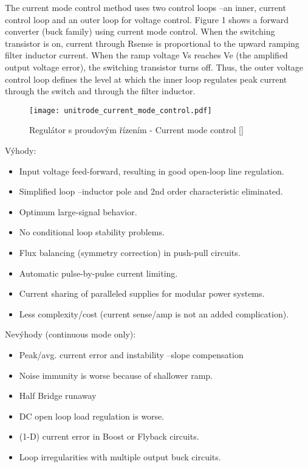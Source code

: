          The current mode control method uses two control loops --an inner, current control loop
         and an outer loop for voltage control. Figure  1 shows a forward converter (buck family)
         using current mode control. When the switching transistor is on, current through Rsense is
         proportional to the upward ramping filter inductor current. When the ramp voltage Vs
         reaches Ve (the amplified  output  voltage  error), the switching transistor turns  off.
         Thus, the outer voltage control loop defines the level at which the inner loop regulates
         peak current through the switch and through the filter inductor. \cite{SLUP075}

        \begin{figure*}
          \centering
          \texttt{[image: unitrode\_current\_mode\_control.pdf]}
          \caption[Regulátor s proudovým řízením]{Regulátor s proudovým řízením - Current mode
                   control [\cite{SLUA119}]}
          \label{ENZ:fig_I_mode_cntrl}
        \end{figure*}

        Výhody:
        \begin{itemize}
          \item Input voltage feed-forward, resulting in good open-loop line regulation.
          \item Simplified loop --inductor pole and 2nd order characteristic eliminated.
          \item Optimum large-signal behavior.
          \item No conditional loop stability  problems.
          \item Flux balancing (symmetry correction) in push-pull circuits.
          \item Automatic pulse-by-pulse current limiting.
          \item Current sharing of paralleled supplies for modular power systems.
          \item Less complexity/cost (current sense/amp is not an added complication).
        \end{itemize}

        Nevýhody (continuous  mode  only):
        \begin{itemize}
          \item Peak/avg. current error and instability --slope compensation
          \item Noise immunity is  worse because of  shallower ramp.
          \item Half Bridge runaway
          \item DC open loop load regulation is worse.
          \item (1-D) current error in Boost or Flyback circuits.
          \item Loop irregularities with multiple output buck circuits.
        \end{itemize}
